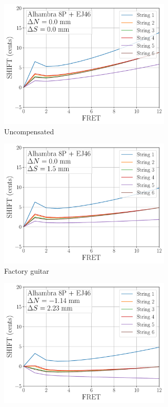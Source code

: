 \begin{figure}
  \centering
  \begin{subfigure}[b]{0.45\textwidth}
   \centering
   \includegraphics[width=3.25in]{figures/shift_alhambra8p_ej46_null}
   \caption{Uncompensated}
   \label{fig:shift_alhambra8p_ej46_null}
  \end{subfigure}
  \hspace{0.25in}
  \begin{subfigure}[b]{0.45\textwidth}
   \centering
   \includegraphics[width=3.25in]{figures/shift_alhambra8p_ej46_factory}
   \caption{Factory guitar}
   \label{fig:shift_alhambra8p_ej46_factory}
  \end{subfigure}
  \par\vspace{0.25in}
  \begin{subfigure}[b]{0.45\textwidth}
   \centering
   \includegraphics[width=3.25in]{figures/shift_alhambra8p_ej46_mean}

\end{subfigure}
\end{figure}
